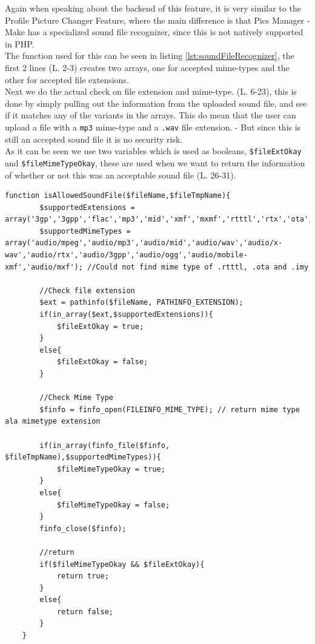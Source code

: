 Again when speaking about the backend of this feature, it is very similar to the Profile Picture Changer Feature, where the main difference is that Pics Manager - Make has a specialized sound file recognizer, since this is not natively supported in PHP.\\
The function used for this can be seen in listing \ref{lst:soundFileRecognizer}, the first 2 lines (L. 2-3) creates two arrays, one for accepted mime-types and the other for accepted file extensions.\\
Next we do the actual check on file extension and mime-type. (L. 6-23), this is done by simply pulling out the information from the uploaded sound file, and see if it matches any of the variants in the arrays. This do mean that the user can upload a file with a \texttt{mp3} mime-type and a \texttt{.wav} file extension. - But since this is still an accepted sound file it is no security risk.\\
As it can be seen we use two variables which is used as booleans, \texttt{\$fileExtOkay} and \texttt{\$fileMimeTypeOkay}, these are used when we want to return the information of whether or not this was an acceptable sound file (L. 26-31).

\lstset{language=PHP}
\begin{lstlisting}[firstline=1,caption={The function used for checking sound files.},label=lst:soundFileRecognizer]
	function isAllowedSoundFile($fileName,$fileTmpName){
		$supportedExtensions = array('3gp','3gpp','flac','mp3','mid','xmf','mxmf','rtttl','rtx','ota','imy','ogg','wav');
		$supportedMimeTypes = array('audio/mpeg','audio/mp3','audio/mid','audio/wav','audio/x-wav','audio/rtx','audio/3gpp','audio/ogg','audio/mobile-xmf','audio/mxf'); //Could not find mime type of .rtttl, .ota and .imy
		
		//Check file extension
		$ext = pathinfo($fileName, PATHINFO_EXTENSION);
		if(in_array($ext,$supportedExtensions)){
			$fileExtOkay = true;
		}
		else{
			$fileExtOkay = false;
		}
		
		//Check Mime Type
		$finfo = finfo_open(FILEINFO_MIME_TYPE); // return mime type ala mimetype extension
		
		if(in_array(finfo_file($finfo, $fileTmpName),$supportedMimeTypes)){
			$fileMimeTypeOkay = true;
		}
		else{
			$fileMimeTypeOkay = false;
		}
		finfo_close($finfo);
		
		//return
		if($fileMimeTypeOkay && $fileExtOkay){
			return true;
		}
		else{
			return false;
		}
	}
\end{lstlisting}

